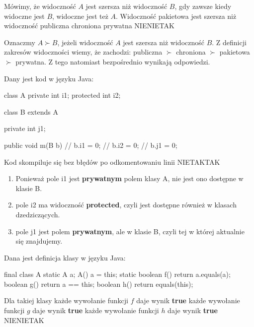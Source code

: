 \begin{solutions}
    \sol Mówimy, że widoczność $A$ jest szersza niż widoczność $B$, gdy zawsze kiedy widoczne jest $B$, widoczne jest też $A$. Widoczność pakietowa jest szersza niż widoczność
    \answerss
    {publiczna}
    {chroniona}
    {prywatna}
    {NIE}{NIE}{TAK}

    Oznaczmy $A \succ B$, jeżeli widoczność $A$ jest szersza niż widoczność $B$. Z definicji zakresów widoczności wiemy, że zachodzi: publiczna $\succ$ chroniona $\succ$ pakietowa $\succ$ prywatna. Z tego natomiast bezpośrednio wynikają odpowiedzi.
    
    \sol Dany jest kod w języku Java:
    \begin{java}
        class A {
            private int i1;
            protected int i2;
        }
        
        class B extends A {
            private int j1;
            
            public void m(B b) {
                // b.i1 = 0;
                // b.i2 = 0;
                // b.j1 = 0;
            }
        }    
    \end{java}
    Kod skompiluje się bez błędów po odkomentowaniu linii
    \answerss
    {}
    {}
    {}
    {NIE}{TAK}{TAK}
    \begin{enumerate}[\bf A.]
        \item Ponieważ pole i1 jest \textbf{prywatnym} polem klasy A, nie jest ono dostępne w klasie B.

        \item pole i2 ma widoczność \textbf{protected}, czyli jest dostępne również w klasach dzedziczących.

        \item pole j1 jest polem \textbf{prywatnym}, ale w klasie B, czyli tej w której aktualnie się znajdujemy.
    \end{enumerate}


    \sol Dana jest definicja klasy w języku Java:
    \begin{java}
        final class A {
            static A a;
            A() { a = this; }
            static boolean f() { return a.equals(a); }
            boolean g() { return a == this; }
            boolean h() { return equals(this); }
        }
    \end{java}
    Dla takiej klasy
    \answerss
    {każde wywołanie funkcji $f$ daje wynik \textbf{true}}
    {każde wywołanie funkcji $g$ daje wynik \textbf{true}}
    {każde wywołanie funkcji $h$ daje wynik \textbf{true}}
    {NIE}{NIE}{TAK}


\end{solutions}
